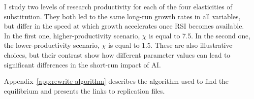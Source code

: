 \ifshowcalibratedrsiscenarios
\else
I study two levels of research productivity for each of the four elasticities of substitution. They both led to the same long-run growth rates in all variables, but differ in the speed at which growth accelerates once RSI becomes available. In the first one, higher-productivity scenario, $\chi$ is equal to 7.5. In the second one,  the lower-productivity scenario, $\chi$ is equal to 1.5. These are also illustrative choices, but their contrast show how different parameter values can lead to significant differences in the short-run impact of AI.
\fi







Appendix~\ref{app:rewrite-algorithm}
describes the algorithm used to find the equilibrium and presents the links to replication files.
